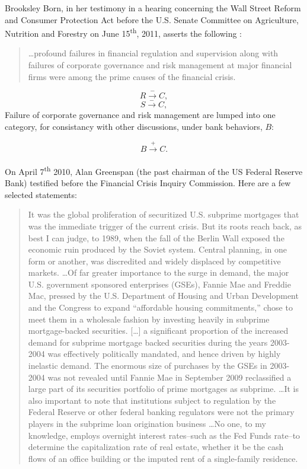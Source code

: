 \documentclass[12pt]{article}
\newcommand{\ts}{\textsuperscript}
\begin{document}
Brooksley Born, in her testimony in a hearing concerning the Wall Street Reform and Consumer Protection Act before the U.S. Senate Committee on Agriculture, Nutrition and Forestry on June 15\ts{th}, 2011, asserts the following :
\begin{quotation}
\ldots profound failures in financial regulation and supervision along with failures of corporate governance and risk management at major financial firms  were among the prime causes of the financial crisis.
\end{quotation}
$$R \xrightarrow{-} C,$$
$$S \xrightarrow{-} C,$$
Failure of corporate governance and risk management are lumped into one category, for consistancy with other discussions, under bank behaviors, $B$:

$$B \xrightarrow{+} C.$$\\

On April 7\ts{th} 2010, Alan Greenspan (the past chairman of the US Federal Reserve Bank) testified before the Financial Crisis Inquiry Commission. Here are a few selected statements:

\begin{quotation}
It was the global proliferation of securitized U.S. subprime mortgages that was the immediate trigger of the current crisis. But its roots reach back, as best I can judge, to 1989, when the fall of the Berlin Wall exposed the economic ruin produced by the Soviet system. Central planning, in one form or another, was discredited and widely displaced by competitive markets. \ldots Of far greater importance to the surge in demand, the major U.S. government sponsored enterprises (GSEs), Fannie Mae and Freddie Mac, pressed by the U.S. Department of Housing and Urban Development and the Congress to expand ``affordable housing commitments,'' chose to meet them in a wholesale fashion by investing heavily in subprime mortgage-backed securities. [\ldots] a significant proportion of the increased demand for subprime mortgage backed securities during the years 2003-2004 was effectively politically mandated, and hence driven by highly inelastic demand. The enormous size of purchases by the GSEs in 2003-2004 was not revealed until Fannie Mae in September 2009 reclassified a large part of its securities portfolio of prime mortgages as subprime. \ldots It is also important to note that institutions subject to regulation by the Federal Reserve or other federal banking regulators were not the primary players in the subprime loan origination business \ldots No one, to my knowledge, employs overnight interest rates--such as the Fed Funds rate--to determine the
capitalization rate of real estate, whether it be the cash flows of an office building or the imputed rent of a single-family residence.
\end{quotation}
\end{document}
